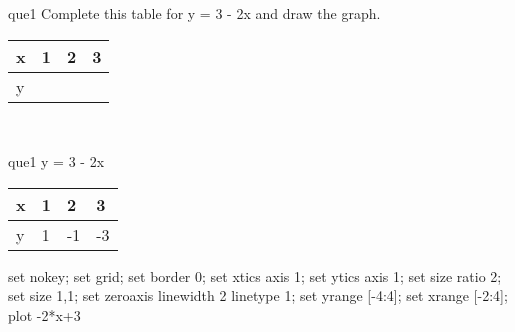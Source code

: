 \documentclass[13.5pt, varwidth=true]{beamer}
\begin{document}
\begin{frame}[shrink=19,fragile]
	\begin{beamercolorbox}[rounded=true, left, shadow=true,wd=14.8cm]{que1}
		 Complete this table for y = 3 - 2x and draw the graph. \\[0.3cm] \renewcommand{\arraystretch}{1.2}\begin{tabular}{|C|C|C|C|} \hline x & 1 & 2 & 3 \\ \hline y & & & \\ \hline \end{tabular}\\[0.3cm]
	\end{beamercolorbox}
\end{frame}
\begin{frame}[shrink=19,fragile]
	\begin{beamercolorbox}[rounded=true, left, shadow=true,wd=14.8cm]{que1}
		y = 3 - 2x\renewcommand{\arraystretch}{1.2}\begin{tabular}{|C|C|C|C|} \hline x & 1 & 2 & 3 \\ \hline y & 1 & -1 & -3\\ \hline \end{tabular}\begin{gnuplot}[terminal=pdf] set nokey; set grid; set border 0; set xtics axis 1; set ytics axis 1; set size ratio 2; set size 1,1; set zeroaxis linewidth 2 linetype 1; set yrange [-4:4]; set xrange [-2:4]; plot -2*x+3 \end{gnuplot}
	\end{beamercolorbox}
\end{frame}
\end{document}
